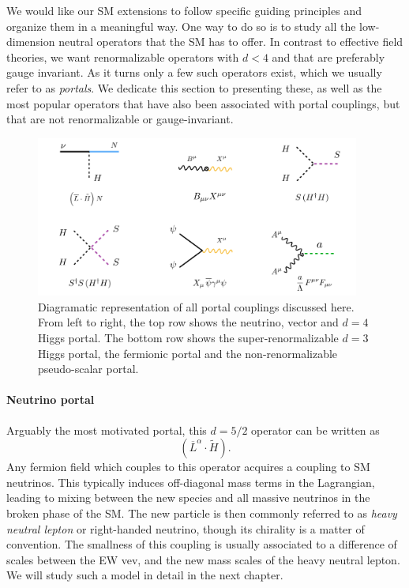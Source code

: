We would like our SM extensions to follow specific guiding principles and organize them in a meaningful way. One way to do so is to study all the low-dimension neutral operators that the SM has to offer. In contrast to effective field theories, we want renormalizable operators with $d<4$ and that are preferably gauge invariant. As it turns only a few such operators exist, which we usually refer to as \emph{portals}. We dedicate this section to presenting these, as well as the most popular operators that have also been associated with portal couplings, but that are not renormalizable or gauge-invariant.
%
\begin{figure}[t]
 \includegraphics[width=0.95\textwidth]{Dark_portals.pdf}
 \caption[Diagramatic representation of the portal couplings discussed.]{Diagramatic representation of all portal couplings discussed here. From left to right, the top row shows the neutrino, vector and $d=4$ Higgs portal. The bottom row shows the super-renormalizable $d=3$ Higgs portal, the fermionic portal and the non-renormalizable pseudo-scalar portal. \label{fig:all_portals}}
\end{figure}
%

\paragraph{Neutrino portal} Arguably the most motivated portal, this $d=5/2$ operator can be written as
\begin{equation}
\left( \overline{L}^\alpha \cdot \tilde{H}\right).%
\end{equation}
%
Any fermion field which couples to this operator acquires a coupling to SM neutrinos. This typically induces off-diagonal mass terms in the Lagrangian, leading to mixing between the new species and all massive neutrinos in the broken phase of the SM. The new particle is then commonly referred to as \emph{heavy neutral lepton} or right-handed neutrino, though its chirality is a matter of convention. The smallness of this coupling is usually associated to a difference of scales between the EW vev, and the new mass scales of the heavy neutral lepton. We will study such a model in detail in the next chapter.

